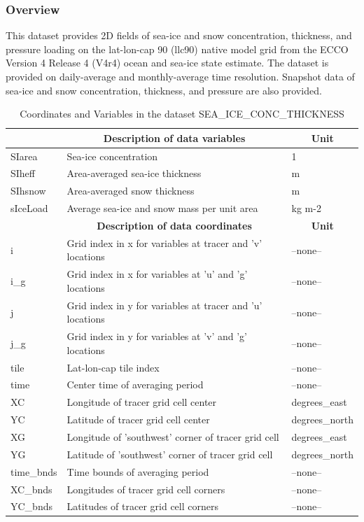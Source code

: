 \subsubsection{Overview}
This dataset provides 2D fields of sea-ice and snow concentration, thickness, and pressure loading on the lat-lon-cap 90 (llc90) native model grid from the ECCO Version 4 Release 4 (V4r4) ocean and sea-ice state estimate. The dataset is provided on daily-average and monthly-average time resolution. Snapshot data of sea-ice and snow concentration, thickness, and pressure are also provided. 
\begin{longtable}{|m{}|m{}|m{}|}
\caption{Coordinates and Variables in the dataset SEA\_ICE\_CONC\_THICKNESS}
\label{tab:table-SEA_ICE_CONC_THICKNESS-fields} \\ 
\hline \endhead \hline \endfoot
\rowcolor{lightgray} \multicolumn{1}{|c|}{\textbf{Variables}} & \multicolumn{1}{|c|}{\textbf{Description of data variables}} &  \multicolumn{1}{|c|}{\textbf{Unit}}\\ \hline
SIarea &Sea-ice concentration &1  \\ \hline
SIheff &Area-averaged sea-ice thickness &m  \\ \hline
SIhsnow &Area-averaged snow thickness &m  \\ \hline
sIceLoad &Average sea-ice and snow mass per unit area &kg m-2  \\ \hline
\rowcolor{lightgray} \multicolumn{1}{|c|}{\textbf{Coordinates}} & \multicolumn{1}{|c|}{\textbf{Description of data coordinates}} &  \multicolumn{1}{|c|}{\textbf{Unit}}\\ \hline
i &Grid index in x for variables at tracer and 'v' locations &--none--  \\ \hline
i\_g &Grid index in x for variables at 'u' and 'g' locations &--none--  \\ \hline
j &Grid index in y for variables at tracer and 'u' locations &--none--  \\ \hline
j\_g &Grid index in y for variables at 'v' and 'g' locations &--none--  \\ \hline
tile &Lat-lon-cap tile index &--none--  \\ \hline
time &Center time of averaging period &--none--  \\ \hline
XC &Longitude of tracer grid cell center &degrees\_east  \\ \hline
YC &Latitude of tracer grid cell center &degrees\_north  \\ \hline
XG &Longitude of 'southwest' corner of tracer grid cell &degrees\_east  \\ \hline
YG &Latitude of 'southwest' corner of tracer grid cell &degrees\_north  \\ \hline
time\_bnds &Time bounds of averaging period &--none--  \\ \hline
XC\_bnds &Longitudes of tracer grid cell corners &--none--  \\ \hline
YC\_bnds &Latitudes of tracer grid cell corners &--none--  \\ \hline
\end{longtable}

